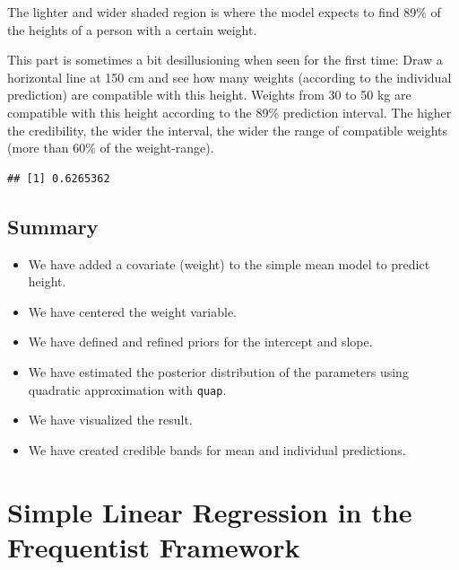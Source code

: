 \documentclass[
]{book}
\newenvironment{Shaded}{\begin{snugshade}}{\end{snugshade}}
\newcommand{\DecValTok}[1]{\textcolor[rgb]{0.00,0.00,0.81}{#1}}
\newcommand{\FunctionTok}[1]{\textcolor[rgb]{0.13,0.29,0.53}{\textbf{#1}}}
\newcommand{\NormalTok}[1]{#1}
\newcommand{\SpecialCharTok}[1]{\textcolor[rgb]{0.81,0.36,0.00}{\textbf{#1}}}
\providecommand{\tightlist}{%
  \setlength{\itemsep}{0pt}\setlength{\parskip}{0pt}}
\begin{document}
The lighter and wider shaded region is where the model expects to find 89\%
of the heights of a person with a certain weight.

This part is sometimes a bit desillusioning when seen for the first time:
Draw a horizontal line at 150 cm and see how many weights (according to
the individual prediction) are compatible with this height. Weights
from 30 to 50 kg are compatible with this height according to the
89\% prediction interval. The higher the credibility, the wider the interval,
the wider the range of compatible weights (more than 60\% of the weight-range).

\begin{Shaded}
\end{Shaded}

\begin{verbatim}
## [1] 0.6265362
\end{verbatim}

\subsection{Summary}\label{summary}

\begin{itemize}
\tightlist
\item
  We have added a covariate (weight) to the simple mean model to predict height.
\item
  We have centered the weight variable.
\item
  We have defined and refined priors for the intercept and slope.
\item
  We have estimated the posterior distribution of the parameters using quadratic approximation with \texttt{quap}.
\item
  We have visualized the result.
\item
  We have created credible bands for mean and individual predictions.
\end{itemize}

\section{Simple Linear Regression in the Frequentist Framework}\label{simple-linear-regression-in-the-frequentist-framework}
\end{document}
